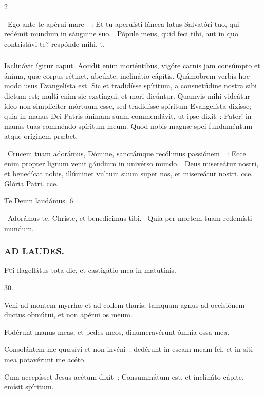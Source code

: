 \documentclass[9pt,twoside]{extarticle}
\begin{document}
\begin{multicols}{2}
{{\begin{tightlist}{}
\item {}~Ego ante te apérui mare~~: \textred{*} Et tu aperuísti láncea latus Salvatóri tuo, qui redémit mundum in sánguine suo. ~Pópule meus, quid feci tibi, aut in quo contristávi te? respónde mihi. t.
\end{tightlist}

\subsubsection*{\center{}}
\lettrine{I}nclinávit ígitur caput. Accidit enim moriéntibus, vigóre carnis jam consúmpto et ánima, quæ corpus rétinet, abeúnte, inclinátio cápitis. Quámobrem verbis hoc modo usus Evangelísta est. Sic et tradidísse spíritum, a consuetúdine nostra sibi dictum est; multi enim sic exstíngui, et mori dicúntur. Quamvis mihi videátur ídeo non simplíciter mórtuum esse, sed tradidísse spíritum Evangelísta dixísse; quia in manus Dei Patris ánimam suam commendávit, ut ipse dixit~: Pater! in manus tuas comméndo spíritum meum. Quod nobis magnæ spei fundaméntum atque oríginem præbet.

\begin{tightlist}{}
\item {}~Crucem tuam adorámus, Dómine, sanctámque recólimus passiónem~~: \textred{*} Ecce enim propter lignum venit gáudium in univérso mundo. ~Deus misereátur nostri, et benedícat nobis, illúminet vultum suum super nos, et misereátur nostri. cce. Glória Patri. cce.
\item Te Deum laudámus. 6.
\item {}~Adorámus te, Christe, et benedícimus tibi. ~Quia per mortem tuam redemísti mundum.
\end{tightlist}

\subsubsection*{\center \textsc{AD LAUDES.}}
\begin{center}\end{center}
\lettrine{F}ui flagellátus tota die, et castigátio mea in matutínis.

\begin{tightlist}{}
\item {} 30.
\item {} Veni ad montem myrrhæ et ad collem thuris; tamquam agnus ad occisiónem ductus obmútui, et non apérui os meum.
\item {} Fodérunt manus meas, et pedes meos, dinumeravérunt ómnia ossa mea.
\item {} Consolántem me quæsívi et non invéni~: dedérunt in escam meam fel, et in siti mea potavérunt me acéto.
\item {} Cum accepísset Jesus acétum dixit~: Consummátum est, et inclináto cápite, emísit spíritum.
\end{tightlist}

}}
\end{multicols}
\end{document}
